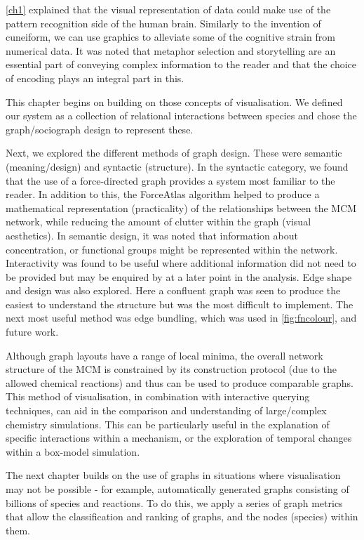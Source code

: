 \autoref{ch1} explained that the visual representation of data could make use of the pattern recognition side of the human brain. Similarly to the invention of cuneiform, we can use graphics to alleviate some of the cognitive strain from numerical data. It was noted that metaphor selection and storytelling are an essential part of conveying complex information to the reader and that the choice of encoding plays an integral part in this.

This chapter begins on building on those concepts of visualisation. We defined our system as a collection of relational interactions between species and chose the graph/sociograph design to represent these.

Next, we explored the different methods of graph design. These were semantic (meaning/design) and syntactic (structure). In the syntactic category, we found that the use of a force-directed graph provides a system most familiar to the reader. In addition to this, the ForceAtlas algorithm helped to produce a mathematical representation (practicality) of the relationships between the MCM network, while reducing the amount of clutter within the graph (visual aesthetics). In semantic design, it was noted that information about concentration, or functional groups might be represented within the network. Interactivity was found to be useful where additional information did not need to be provided but may be enquired by at a later point in the analysis. Edge shape and design was also explored. Here a confluent graph was seen to produce the easiest to understand the structure but was the most difficult to implement. The next most useful method was edge bundling, which was used in \autoref{fig:fncolour}, and future work.

Although graph layouts have a range of local minima, the overall network structure of the MCM is constrained by its construction protocol (due to the allowed chemical reactions) and thus can be used to produce comparable graphs. This method of visualisation, in combination with interactive querying techniques, can aid in the comparison and understanding of large/complex chemistry simulations. This can be particularly useful in the explanation of specific interactions within a mechanism, or the exploration of temporal changes within a box-model simulation.

The next chapter builds on the use of graphs in situations where visualisation may not be possible - for example, automatically generated graphs consisting of billions of species and reactions. To do this, we apply a series of graph metrics that allow the classification and ranking of graphs, and the nodes (species) within them.
